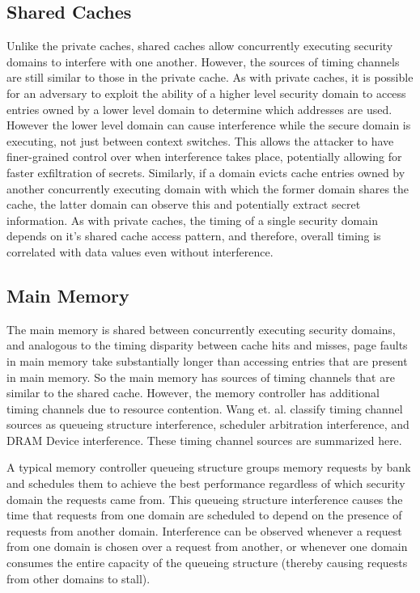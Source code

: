 \subsection{Shared Caches}
Unlike the private caches, shared caches allow concurrently executing security 
domains to interfere with one another. However, the sources of timing channels 
are still similar to those in the private cache. As with private caches, it is 
possible for an adversary to exploit the ability of a higher level security 
domain to access entries owned by a lower level domain to determine which 
addresses are used. However the lower level domain can cause interference while 
the secure domain is executing, not just between context switches. This allows 
the attacker to have finer-grained control over when interference takes place, 
potentially allowing for faster exfiltration of secrets. Similarly, if a domain 
evicts cache entries owned by another concurrently executing domain with which 
the former domain shares the cache, the latter domain can observe this and 
potentially extract secret information. As with private caches, the timing of a 
single security domain depends on it's shared cache access pattern, and 
therefore, overall timing is correlated with data values even without 
interference.

\subsection{Main Memory}
The main memory is shared between concurrently executing security domains, and 
analogous to the timing disparity between cache hits and misses, page faults in 
main memory take substantially longer than accessing entries that are present 
in main memory. So the main memory has sources of timing channels that are 
similar to the shared cache. However, the memory controller has additional 
timing channels due to resource contention. Wang et. al. classify timing 
channel sources as queueing structure interference, scheduler arbitration 
interference, and DRAM Device interference. These timing channel sources are 
summarized here.

A typical memory controller queueing structure groups memory requests by bank 
and schedules them to achieve the best performance regardless of which security 
domain the requests came from. This queueing structure interference causes the 
time that requests from one domain are scheduled to depend on the presence of 
requests from another domain. Interference can be observed whenever a request 
from one domain is chosen over a request from another, or whenever one domain 
consumes the entire capacity of the queueing structure (thereby causing 
requests from other domains to stall).

